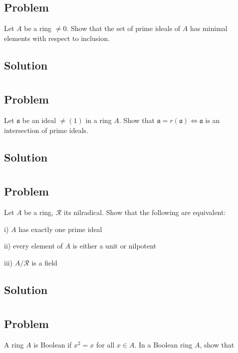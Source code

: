 \documentclass[book,12pt,oneside,openany]{memoir}
\begin{document}
\subsection{Problem}
Let $A$ be a ring $\neq 0$. Show that the set of prime ideals of $A$ has minimal elements with respect to inclusion.
\subsection{Solution}



\section{}
\subsection{Problem}
Let $\mathfrak{a}$ be an ideal $\neq (1)$ in a ring $A$. Show that $\mathfrak{a} = r(\mathfrak{a}) \Leftrightarrow \mathfrak{a}$ is an intersection of prime ideals.
\subsection{Solution}



\section{}
\subsection{Problem}
Let $A$ be a ring, $\mathcal{R}$ its nilradical. Show that the following are equivalent:

i) $A$ has exactly one prime ideal

ii) every element of $A$ is either a unit or nilpotent

iii) $A/\mathcal{R}$ is a field
\subsection{Solution}



\section{}
\subsection{Problem}
A ring $A$ is Boolean if $x^2 = x$ for all $x \in A$. In a Boolean ring $A$, show that 
\end{document}
